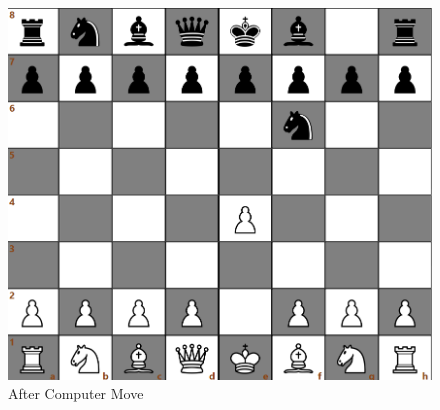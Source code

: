 \documentclass[a4paper,12pt]{article}
\begin{document}
\begin{figure}[H]
    \centering
    \includegraphics[width=0.7\linewidth]{Images/Test Cases/testCase10Img2.png}
    \caption{After Computer Move}
    \label{fig:AfterComputerMove}
\end{figure}
\end{document}
